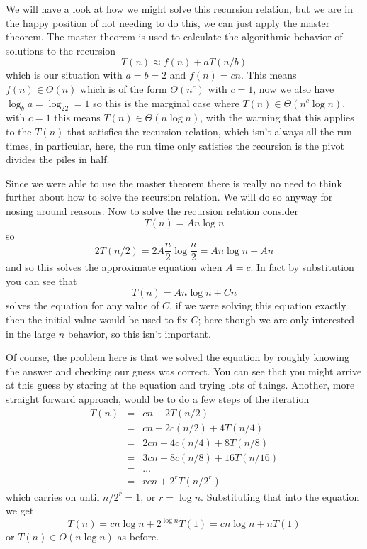 \documentclass[11pt,a4paper]{scrartcl}
\begin{document}
We will have a look at how we might solve this recursion relation, but
we are in the happy position of not needing to do this, we can just
apply the master theorem. The master theorem is used to calculate the algorithmic behavior of solutions to the recursion
\begin{equation}
T(n)\approx f(n)+aT(n/b)
\end{equation}
which is our situation with $a=b=2$ and $f(n)=cn$. This means $f(n)\in
\Theta(n)$ which is of the form $\Theta(n^c)$ with $c=1$, now we also
have $\log_ba=\log_22=1$ so this is the marginal case where $T(n)\in
\Theta(n^c\log n)$, with $c=1$ this means $T(n)\in \Theta(n\log n)$,
with the warning that this applies to the $T(n)$ that satisfies the
recursion relation, which isn't always all the run times, in
particular, here, the run time only satisfies the recursion is the
pivot divides the piles in half.

Since we were able to use the master theorem there is really no need
to think further about how to solve the recursion relation. We will do
so anyway for nosing around reasons. Now to solve the recursion
relation consider
\begin{equation}
T(n)=An\log{n}
\end{equation}
so
\begin{equation}
2T(n/2)=2A\frac{n}{2}\log{\frac{n}{2}}=An\log{n}-An
\end{equation}
and so this solves the approximate equation when $A=c$. In fact by substitution you can see that
\begin{equation}
T(n)=An\log{n}+Cn
\end{equation}
solves the equation for any value of $C$, if we were solving this
equation exactly then the initial value would be used to fix $C$; here
though we are only interested in the large $n$ behavior, so this isn't
important.

Of course, the problem here is that we solved the equation by roughly
knowing the answer and checking our guess was correct. You can see
that you might arrive at this guess by staring at the equation and
trying lots of things. Another, more straight forward approach, would
be to do a few steps of the iteration
\begin{eqnarray}
T(n)&=&cn+2T(n/2)\\
    &=&cn+2c(n/2)+4T(n/4)\\
    &=&2cn+4c(n/4)+8T(n/8)\\
    &=&3cn+8c(n/8)+16T(n/16)\\
    &=&\ldots\\
    &=&rcn+2^rT(n/2^r)
\end{eqnarray}
which carries on until $n/2^r=1$, or $r=\log{n}$. Substituting that into the equation we get 
\begin{equation}
T(n)=cn\log{n}+2^{\log{n}}T(1)=cn\log{n}+nT(1)
\end{equation}
or $T(n)\in O(n\log{n})$ as before. 
\end{document}
